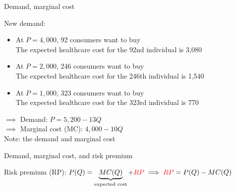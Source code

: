 \begin{frame}{Demand, marginal cost}

    New demand:
    \begin{itemize}
        \item At $P=4,000$, 92 consumers want to buy\\
        {\color{blue} The expected healthcare cost for the 92nd individual is 3,080}
        \item At $P=2,000$, 246 consumers want to buy\\
        {\color{blue} The expected healthcare cost for the 246th individual is 1,540}
        \item At $P=1,000$, 323 consumers want to buy\\
        {\color{blue} The expected healthcare cost for the 323rd individual is 770}
    \end{itemize}
    $\implies$ Demand: $P = 5,200 - 13Q$\\
    $\implies$ Marginal cost (MC): $4,000 - 10Q$\\
    \vspace{2mm}
    Note: the demand and marginal cost 
\end{frame}
\begin{frame}{Demand, marginal cost, and risk premium}

    Risk premium (RP): $ P(Q) = \underbrace{MC(Q)}_{\text{expected cost}} + {\color{red} RP} \implies {\color{red} RP} = P(Q) - MC(Q)$

    \begin{center}
    \end{center}
\end{frame}
